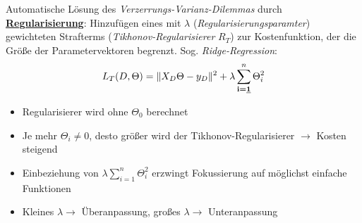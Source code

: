 Automatische Lösung des \emph{Verzerrungs-Varianz-Dilemmas} durch \textbf{\underline{Regularisierung}}: Hinzufügen eines mit $\lambda$  (\emph{Regularisierungsparamter}) gewichteten Strafterms (\emph{Tikhonov-Regularisierer} $R_T$) zur Kostenfunktion, der die Größe der Parametervektoren begrenzt. Sog. \emph{Ridge-Regression}:\\

\begin{equation*}
    L_T(D, \Theta) = \Vert X_D\Theta-y_D\Vert^2 + \lambda \sum_{\textbf{i=\underline{1}}}^{n}\Theta_i^2\\
\end{equation*}

\begin{itemize}
    \item Regularisierer wird ohne $\Theta_0$ berechnet
    \item Je mehr $\Theta_i \neq 0$, desto größer wird der Tikhonov-Regularisierer $\rightarrow$ Kosten steigend
    \item Einbeziehung von $\lambda \sum_{i=1}^{n}\Theta_i^2$ erzwingt Fokussierung auf möglichst einfache Funktionen
    \item Kleines $\lambda\rightarrow$ Überanpassung, großes $\lambda\rightarrow$ Unteranpassung
\end{itemize}

